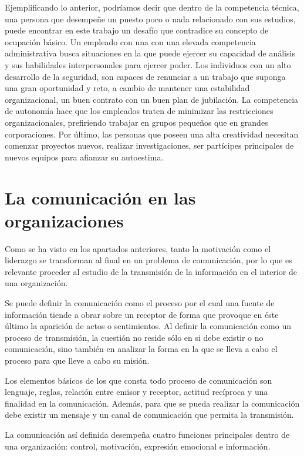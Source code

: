 \documentclass[
]{krantz}
\begin{document}
Ejemplificando lo anterior, podríamos decir que dentro de la competencia técnica, una persona que desempeñe un puesto poco o nada relacionado con sus estudios, puede encontrar en este trabajo un desafío que contradice su concepto de ocupación básico. Un empleado con una con una elevada competencia administrativa busca situaciones en la que puede ejercer su capacidad de análisis y sus habilidades interpersonales para ejercer poder. Los individuos con un alto desarrollo de la seguridad, son capaces de renunciar a un trabajo que suponga una gran oportunidad y reto, a cambio de mantener una estabilidad organizacional, un buen contrato con un buen plan de jubilación. La competencia de autonomía hace que los empleados traten de minimizar las restricciones organizacionales, prefiriendo trabajar en grupos pequeños que en grandes corporaciones. Por último, las personas que poseen una alta creatividad necesitan comenzar proyectos nuevos, realizar investigaciones, ser partícipes principales de nuevos equipos para afianzar su autoestima.

\hypertarget{la-comunicaciuxf3n-en-las-organizaciones}{%
\section{La comunicación en las organizaciones}\label{la-comunicaciuxf3n-en-las-organizaciones}}

Como se ha visto en los apartados anteriores, tanto la motivación como el liderazgo se transforman al final en un problema de comunicación, por lo que es relevante proceder al estudio de la transmisión de la información en el interior de una organización.

Se puede definir la comunicación como el proceso por el cual una fuente de información tiende a obrar sobre un receptor de forma que provoque en éste último la aparición de actos o sentimientos. Al definir la comunicación como un proceso de transmisión, la cuestión no reside sólo en si debe existir o no comunicación, sino también en analizar la forma en la que se lleva a cabo el proceso para que lleve a cabo su misión.

Los elementos básicos de los que consta todo proceso de comunicación son lenguaje, reglas, relación entre emisor y receptor, actitud recíproca y una finalidad en la comunicación. Además, para que se pueda realizar la comunicación debe existir un mensaje y un canal de comunicación que permita la transmisión.

La comunicación así definida desempeña cuatro funciones principales dentro de una organización: control, motivación, expresión emocional e información.
\end{document}
